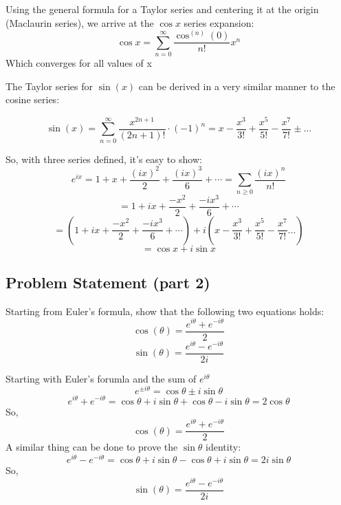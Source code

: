 \documentclass{article}
\begin{document}
Using the general formula for a Taylor series and centering it at the origin (Maclaurin series), we arrive
at the $\cos{x}$ series expansion:
\[\cos x = \sum_{n=0}^\infty{\frac{\cos^{(n)}(0)}{n!}x^n} \]
Which converges for all values of x

\newline
The Taylor series for $\sin(x)$ can be derived in a very similar manner to the cosine series:


\[\sin(x)=\sum\limits_{n=0}^\infty \dfrac{x^{2n+1}}{(2n+1)!}\cdot(-1)^n = x-\dfrac{x^3}{3!}+\dfrac{x^5}{5!}-\dfrac{x^7}{7!}\pm\dots\]


So, with three series defined, it's easy to show:
\[e^{ix} = 1 + x + \frac{(ix)^2}{2} + \frac{(ix)^3}{6} + \cdots = \sum_{n\geq 0} \frac{(ix)^n}{n!}\]
\[ = 1 + ix + \frac{-x^2}{2} + \frac{-ix^3}{6} + \cdots \]
\[ = (1 + ix + \frac{-x^2}{2} + \frac{-ix^3}{6} + \cdots ) + i (x - \dfrac{x^3}{3!} + \dfrac{x^5}{5!} - \dfrac{x^7}{7!} ...) \]
\[ = \cos{x} + i\sin{x} \]

\subsection*{Problem Statement (part 2)}
Starting from Euler's formula, show that the following two equations holds:
\[\cos (\theta) = \frac{e^{i\theta}+e^{-i\theta}}{2}\]
\[\sin (\theta) = \frac{e^{i\theta}-e^{-i\theta}}{2i}\]

Starting with Euler's forumla and the sum of $e^{i\theta}$
\[e^{\pm i\theta } = \cos \theta \pm i\sin \theta \]
\[e^{i\theta } + e^{-i\theta} = \cos \theta + i\sin \theta + \cos\theta - i\sin \theta  = 2\cos \theta\]
So,
\[\cos (\theta) = \frac{e^{i\theta}+e^{-i\theta}}{2}\]
A similar thing can be done to prove the $\sin \theta$ identity:
\[e^{i\theta } - e^{-i\theta} = \cos \theta + i\sin \theta - \cos\theta + i\sin \theta  = 2i\sin \theta\]
So,
\[\sin (\theta) = \frac{e^{i\theta}-e^{-i\theta}}{2i}\]
\end{document}
